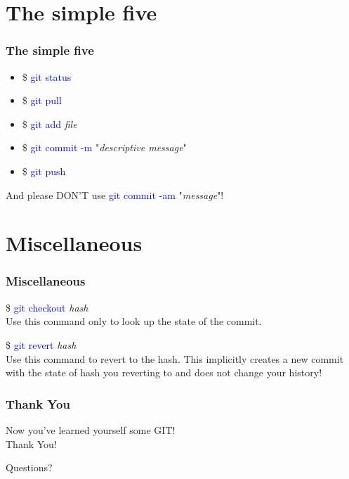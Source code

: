 \documentclass[aspectratio=169]{beamer}
\begin{document}
\section{The simple five}
\begin{frame}

\frametitle{The simple five}

\begin{itemize}
\item \$ \textcolor{blue}{git status}\\
\item \$ \textcolor{blue}{git pull}\\
\item \$ \textcolor{blue}{git add} \textit{file}\\
\item \$ \textcolor{blue}{git commit -m} "\textit{descriptive message}"\\
\item \$ \textcolor{blue}{git push}\\
\end{itemize}

And please DON'T use \textcolor{blue}{git commit -am} "\textit{message}"!

\end{frame}

\section{Miscellaneous}
\begin{frame}

\frametitle{Miscellaneous}

\$ \textcolor{blue}{git checkout} \textit{hash}\\
Use this command only to look up the state of the commit.

\$ \textcolor{blue}{git revert} \textit{hash}\\
Use this command to revert to the hash. This implicitly creates a new commit with the state of hash you reverting to and does not change your history!

\end{frame}

\begin{frame}

\frametitle{Thank You}

\begin{center}
Now you've learned yourself some GIT!\\
Thank You!

Questions?
\end{center}

\end{frame}

\end{document}
